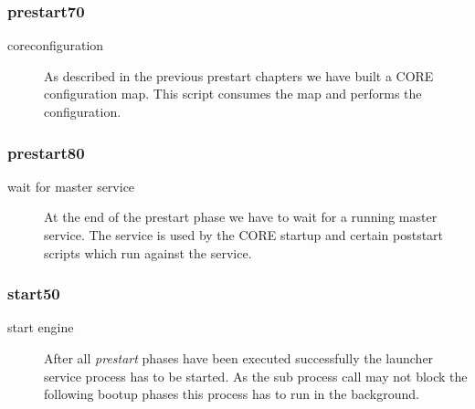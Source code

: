			\subsubsection{prestart70}
			\begin{description}
				\item[coreconfiguration] As described in the previous prestart chapters we have built a CORE configuration map. This script consumes the map and performs the configuration.
			\end{description}
			\subsubsection{prestart80}
			\begin{description}
				\item[wait for master service] At the end of the prestart phase we have to wait for a running master service. The service is used by the CORE startup and certain poststart scripts which run against the service.
			\end{description}
			\subsubsection{start50}
			\begin{description}
				\item[start engine] After all \emph{prestart} phases have been executed successfully the launcher service process has to be started. As the sub process call may not block the following bootup phases this process has to run in the background.
			\end{description}
